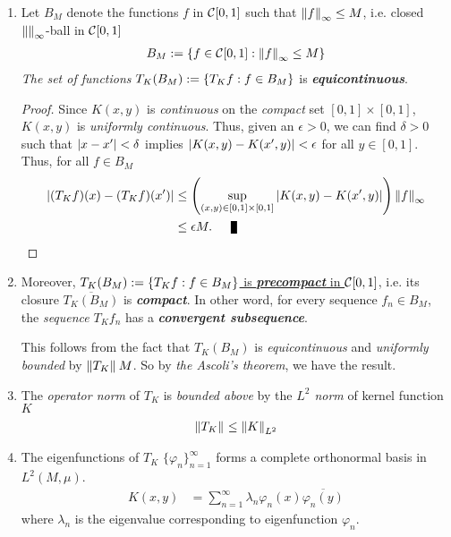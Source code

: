 \documentclass[11pt]{article}
\begin{document}
\begin{itemize}
\begin{remark}
\begin{enumerate}
\item Let $B_M$ denote the functions $f$ in ${\mathcal C}[0, 1]$ such that $\left\|f\right\|_{\infty} \le M$, i.e. closed $\left\|\right\|_{\infty}$-ball in ${\mathcal C}[0, 1]$
\begin{align*}
B_M := \left\{f \in {\mathcal C}[0, 1]: \left\|f\right\|_{\infty} \le M\right\}
\end{align*} \emph{The set of functions} $T_K(B_M) := \left\{T_{K}f: f\in B_M\right\}$ is \emph{\textbf{equicontinuous}}.
\begin{proof}
Since $K(x, y)$ is \emph{continuous} on the \textit{compact} set $[0,1]\times [0,1]$, $K(x, y)$ is \emph{uniformly continuous}. Thus, given an $\epsilon > 0$, we can find  $\delta > 0$ such that $\left\lvert x - x' \right\rvert < \delta$ implies $\left\lvert K(x, y) - K(x', y)  \right\rvert < \epsilon$ for all $y \in  [0, 1]$. 
Thus, for all $f \in B_M$
\begin{align*}
\abs{(T_{K}f)(x) - (T_{K}f)(x')} & \le \paren{\sup_{(x,y) \in [0,1]\times [0,1]}\abs{K(x,y) - K(x', y)}}\norm{f}{\infty} \\
& \le \epsilon M. \qed
\end{align*} 
\end{proof}

\item Moreover, \underline{$T_K(B_M) := \left\{T_{K}f: f\in B_M\right\}$ is \emph{\textbf{precompact}} in ${\mathcal C}[0,1]$}, i.e. its closure $\overline{T_K(B_M)}$ is \emph{\textbf{compact}}. In other word, for every sequence $f_n \in B_M$, the \emph{sequence} $T_K f_n$  has a \emph{\textbf{convergent subsequence}}. 

This follows from the fact that $T_K(B_M)$ is \emph{equicontinuous} and \emph{uniformly bounded} by $\left\|T_{K}\right\|_{}M$. So by \emph{the Ascoli's theorem}, we have the result.

\item The \emph{operator norm} of $T_K$ is \emph{bounded above} by the \emph{$L^2$ norm} of kernel function $K$
\begin{align*}
\left\|T_K\right\|_{} \le \left\|K\right\|_{L^2}
\end{align*}

\item The eigenfunctions of $T_K$ $\{\varphi_n\}_{n=1}^{\infty}$ forms a complete orthonormal basis in $L^2(M, \mu)$.  
\begin{align*}
K(x,y) &= \sum_{n=1}^{\infty}\lambda_{n}\varphi_n(x)\overline{\varphi_n(y)}
\end{align*} where $\lambda_n$ is the eigenvalue corresponding to eigenfunction $\varphi_n$.
\end{enumerate}
\end{remark}


\end{itemize}
\end{document}
